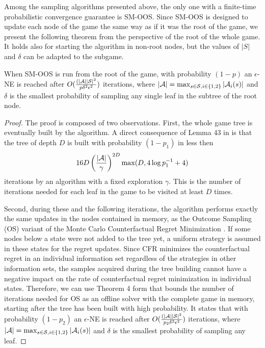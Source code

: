 {Among the sampling algorithms presented above, the only one with a finite-time probabilistic convergence guarantee is SM-OOS. Since SM-OOS is designed to update each node of the game the same way as if it was the root of the game, we present the following theorem from the perspective of the root of the whole game. It holds also for starting the algorithm in non-root nodes, but the values of $|S|$ and $\delta$ can be adapted to the subgame.

\begin{theorem}
When SM-OOS is run from the root of the game, with probability $(1-p)$ an $\epsilon$-NE is reached after
$O(\frac{(|\mathcal{A}||\mathcal{S}|^2}{p \delta^2 \epsilon^2})$ iterations, where $|\mathcal{A}| = \max_{s \in \mathcal{S}, i \in \{1,2 \}}{|\mathcal{A}_i(s)|}$ and $\delta$ is the smallest probability of sampling any single leaf in the subtree of the root node. 
\end{theorem}

\begin{proof}
The proof is composed of two observations. 
First, the whole game tree is eventually built by the algorithm.
 A direct consequence of Lemma 43 in \cite{Kovarik2015Analysis} is that the tree of depth $D$ is built with probability $(1-p_1)$ in less then $$16 D \left(\frac{|\mathcal{A}|}{\gamma}\right)^{2D} \max(D,4 \log p_1^{-1} + 4)$$ iterations by an algorithm with a fixed exploration $\gamma$.
This is the number of iterations needed for each leaf in the game to be visited at least $D$ times.

Second, during these and the following iterations, the algorithm performs exactly the same updates in the nodes contained in memory, as the Outcome Sampling (OS) variant of the Monte Carlo Counterfactual Regret Minimization  \cite{Lanctot09Sampling}. 
If some nodes below a state were not added to the tree yet, a uniform strategy is assumed in these states for the regret updates.
Since CFR minimizes the counterfactual regret in an individual information set regardless of the strategies in other information sets, the samples acquired during the tree building cannot have a negative impact on the rate of counterfactual regret minimization in individual states.
Therefore, we can use Theorem 4 form \cite{Lanctot09Sampling} that bounds the number of iterations needed for OS as an offline solver with the complete game in memory, starting after the tree has been built with high probability.
It states that with probability $(1-p_2)$ an $\epsilon$-NE is reached after $O(\frac{(|\mathcal{A}||\mathcal{S}|^2}{p_2 \delta^2 \epsilon^2})$ iterations, where $|\mathcal{A}| = \max_{s \in \mathcal{S}, i \in \{1,2 \}}{|\mathcal{A}_i(s)|}$ and $\delta$ is the smallest probability of sampling any leaf. 


\end{proof}}
